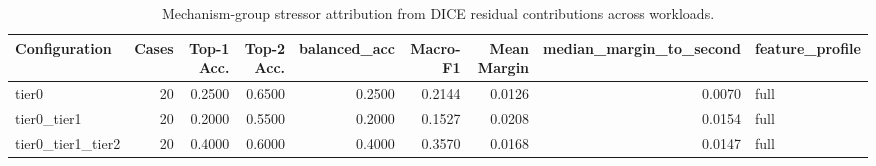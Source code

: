 \begin{table}[t]
\centering
\caption{Mechanism-group stressor attribution from DICE residual contributions across workloads.}
\label{tab:dice_stressor_diagnosis}
\footnotesize
\begin{tabular}{lrrrrrrrl}
\toprule
Configuration & Cases & Top-1 Acc. & Top-2 Acc. & balanced_acc & Macro-F1 & Mean Margin & median_margin_to_second & feature_profile \\
\midrule
tier0 & 20 & 0.2500 & 0.6500 & 0.2500 & 0.2144 & 0.0126 & 0.0070 & full \\
tier0_tier1 & 20 & 0.2000 & 0.5500 & 0.2000 & 0.1527 & 0.0208 & 0.0154 & full \\
tier0_tier1_tier2 & 20 & 0.4000 & 0.6000 & 0.4000 & 0.3570 & 0.0168 & 0.0147 & full \\
\bottomrule
\end{tabular}

\end{table}
